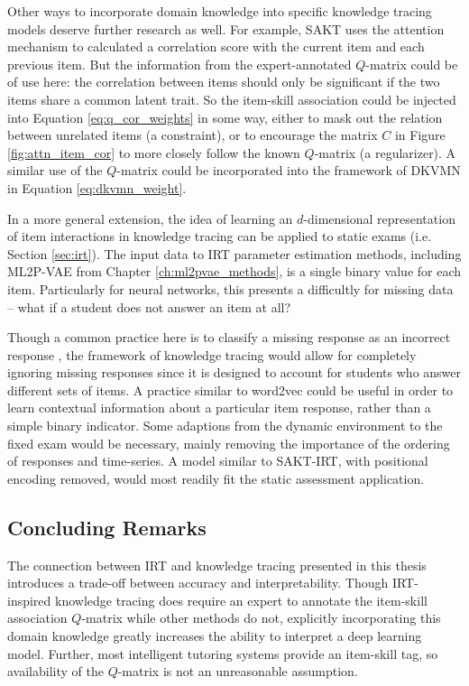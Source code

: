 Other ways to incorporate domain knowledge into specific knowledge tracing models deserve further research as well. For example, SAKT uses the attention mechanism to calculated a correlation score with the current item and each previous item. But the information from the expert-annotated $Q$-matrix could be of use here: the correlation between items should only be significant if the two items share a common latent trait. So the item-skill association could be injected into Equation \ref{eq:q_cor_weights} in some way, either to mask out the relation between unrelated items (a constraint), or to encourage the matrix $C$ in Figure \ref{fig:attn_item_cor} to more closely follow the known $Q$-matrix (a regularizer). A similar use of the $Q$-matrix could be incorporated into the framework of DKVMN in Equation \ref{eq:dkvmn_weight}.

In a more general extension, the idea of learning an $d$-dimensional representation of item interactions in knowledge tracing can be applied to static exams (i.e. Section \ref{sec:irt}). The input data to IRT parameter estimation methods, including ML2P-VAE from Chapter \ref{ch:ml2pvae_methods}, is a single binary value for each item. Particularly for neural networks, this presents a difficultly for missing data -- what if a student does not answer an item at all?

Though a common practice here is to classify a missing response as an incorrect response \cite{thissen}, the framework of knowledge tracing would allow for completely ignoring missing responses since it is designed to account for students who answer different sets of items. A practice similar to word2vec \cite{mikolov2013} could be useful in order to learn contextual information about a particular item response, rather than a simple binary indicator. Some adaptions from the dynamic environment to the fixed exam would be necessary, mainly removing the importance of the ordering of responses and time-series. A model similar to SAKT-IRT, with positional encoding removed, would most readily fit the static assessment application.

\subsection{Concluding Remarks}
The connection between IRT and knowledge tracing presented in this thesis introduces a trade-off between accuracy and interpretability. Though IRT-inspired knowledge tracing does require an expert to annotate the item-skill association $Q$-matrix while other methods do not, explicitly incorporating this domain knowledge greatly increases the ability to interpret a deep learning model. Further, most intelligent tutoring systems provide an item-skill tag, so availability of the $Q$-matrix is not an unreasonable assumption.


